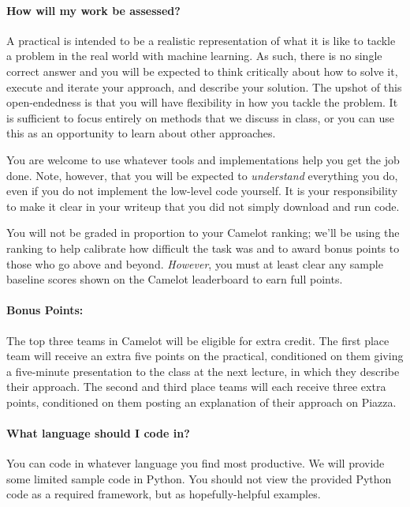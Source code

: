 \documentclass[12pt,letterpaper]{article}
\begin{document}
\paragraph{How will my work be assessed?}
A practical is intended to be a realistic representation of what it
is like to tackle a problem in the real world with machine learning.
As such, there is no single correct answer and you will be expected to
think critically about how to solve it, execute and iterate your
approach, and describe your solution.  The upshot of this
open-endedness is that you will have flexibility in how you tackle the
problem.  It is sufficient to focus entirely on methods that we
discuss in class, or you can use this as an opportunity to learn about
other approaches.

You are welcome to use whatever tools and implementations help you get
the job done.  Note, however, that you will be expected to
\emph{understand} everything you do, even if you do not implement the
low-level code yourself.  It is your responsibility to make it clear
in your writeup that you did not simply download and run code.


You will not be graded in proportion to your Camelot ranking; we'll be using
the ranking to help calibrate how difficult the task was and to award
bonus points to those who go above and beyond.  \textit{However}, you
must at least clear any sample baseline scores shown on the Camelot
leaderboard to earn full points.


\paragraph{Bonus Points:}
The top three teams in Camelot will be eligible for extra credit.  The
first place team will receive an extra five points on the practical,
conditioned on them giving a five-minute presentation to the class at
the next lecture, in which they describe their approach.  The second
and third place teams will each receive three extra points,
conditioned on them posting an explanation of their approach on
Piazza.

\paragraph{What language should I code in?}
You can code in whatever language you find most productive.  We will
provide some limited sample code in Python.  You should not view the
provided Python code as a required framework, but as hopefully-helpful
examples.
\end{document}
